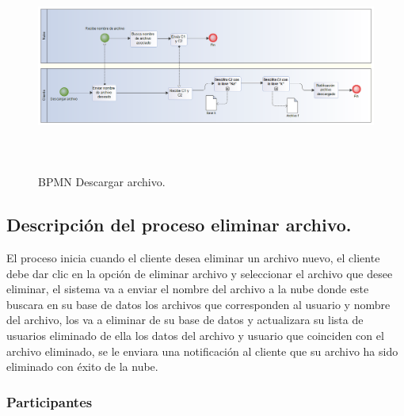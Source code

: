 \begin{figure}[H]
\centering
	\includegraphics[width=16cm, height=7cm]{./images/BPM_Descargar.png}
	\caption{BPMN Descargar archivo.}

\end{figure}

\vspace{3cm}
\subsection{Descripción del proceso eliminar archivo.}

El proceso inicia cuando el cliente desea eliminar un archivo nuevo, el cliente debe dar clic en la opción de eliminar archivo y seleccionar el archivo que desee eliminar, el sistema va a enviar el nombre del archivo a la nube donde este buscara en su base de datos los archivos que corresponden al usuario y nombre del archivo, los va a eliminar de su base de datos y actualizara su lista de usuarios eliminado de ella los datos del archivo y usuario que coinciden con el archivo eliminado, se le enviara una notificación al cliente que su archivo ha sido eliminado con éxito de la nube.\\



\subsubsection{Participantes}

